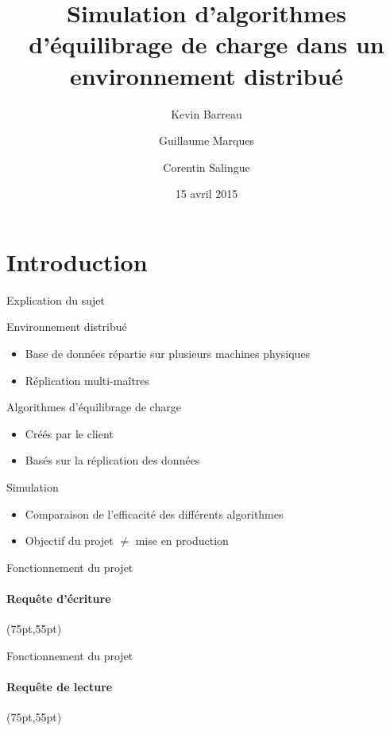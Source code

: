 \documentclass{beamer}
\title[Projet de Programmation]{Simulation d'algorithmes \\d'équilibrage de charge dans un \\environnement distribué}
\author{Kevin Barreau \and Guillaume Marques \and Corentin Salingue}
\institute{Université de Bordeaux}
\date{15 avril 2015}
\begin{document}
\mode* %



%
\begin{frame}
\titlepage
\end{frame}


\section{Introduction}

\begin{frame}{Explication du sujet}
\begin{block}{Environnement distribué}
\begin{itemize}
	\item Base de données répartie sur plusieurs machines physiques
	\item Réplication multi-maîtres
\end{itemize}
\end{block}
\begin{block}{Algorithmes d'équilibrage de charge}
\begin{itemize}
	\item Créés par le client
	\item Basés sur la réplication des données
\end{itemize}
\end{block}
\begin{block}{Simulation}
\begin{itemize}
	\item Comparaison de l'efficacité des différents algorithmes
	\item Objectif du projet $\neq$ mise en production
\end{itemize}
\end{block}
\end{frame}

\begin{frame}{Fonctionnement du projet}
\framesubtitle{Requête d'écriture}
\begin{textblock*}{\paperwidth}(75pt,55pt)
\end{textblock*}
\end{frame}

\begin{frame}{Fonctionnement du projet}
\framesubtitle{Requête de lecture}
\begin{textblock*}{\paperwidth}(75pt,55pt)
\end{textblock*}
\end{frame}
\end{document}
